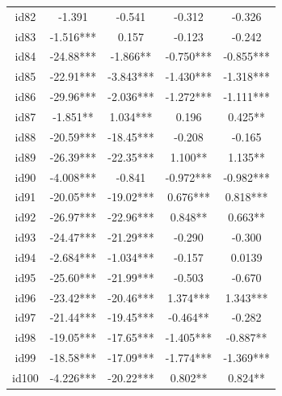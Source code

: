 \documentclass[num-refs]{wiley-article}
\begin{document}
\begin{center}
\begin{longtable}{ccccc}
id82                     & -1.391    & -0.541         & -0.312            & -0.326            \\
id83                     & -1.516*** & 0.157          & -0.123            & -0.242            \\
id84                     & -24.88*** & -1.866**       & -0.750***         & -0.855***         \\
id85                     & -22.91*** & -3.843***      & -1.430***         & -1.318***         \\
id86                     & -29.96*** & -2.036***      & -1.272***         & -1.111***         \\
id87                     & -1.851**  & 1.034***       & 0.196             & 0.425**           \\
id88                     & -20.59*** & -18.45***      & -0.208            & -0.165            \\
id89                     & -26.39*** & -22.35***      & 1.100**           & 1.135**           \\
id90                     & -4.008*** & -0.841         & -0.972***         & -0.982***         \\
id91                     & -20.05*** & -19.02***      & 0.676***          & 0.818***          \\
id92                     & -26.97*** & -22.96***      & 0.848**           & 0.663**           \\
id93                     & -24.47*** & -21.29***      & -0.290            & -0.300            \\
id94                     & -2.684*** & -1.034***      & -0.157            & 0.0139            \\
id95                     & -25.60*** & -21.99***      & -0.503            & -0.670            \\
id96                     & -23.42*** & -20.46***      & 1.374***          & 1.343***          \\
id97                     & -21.44*** & -19.45***      & -0.464**          & -0.282            \\
id98                     & -19.05*** & -17.65***      & -1.405***         & -0.887**          \\
id99                     & -18.58*** & -17.09***      & -1.774***         & -1.369***         \\
id100                    & -4.226*** & -20.22***      & 0.802**           & 0.824**           \\

\end{longtable}
\end{center}
\end{document}
